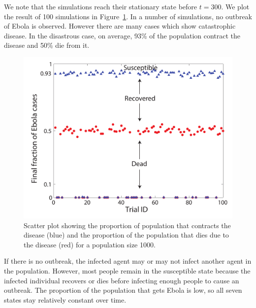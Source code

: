 We note that the simulations reach their stationary state before $t = 300$. We plot the result of 100 simulations in Figure~\ref{fig:Scatter}. In a number of simulations, no outbreak of Ebola is observed. However there are many cases which show catastrophic disease. In the disastrous case, on average, 93\% of the population contract the disease and 50\% die from it. 

 
\begin{figure}[h!]
\begin{center}
\includegraphics[scale=0.5]{N1000Scatter.pdf}
\end{center}
\caption{Scatter plot showing the proportion of population that contracts the disease (blue) and the proportion of the population that dies due to the disease (red) for a population size 1000. }%
\label{fig:Scatter}
\end{figure}


If there is no outbreak, the infected agent may or may not infect another agent in the population. However, most people remain in the  susceptible state because the infected individual recovers or dies before infecting enough people to cause an outbreak. The proportion of the population that gets Ebola is low, so all seven states stay relatively constant over time. %

